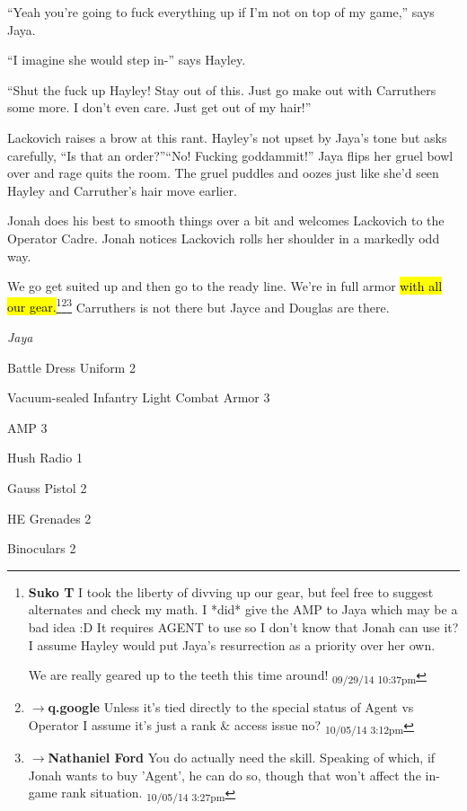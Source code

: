 ``Yeah you're going to fuck everything up if I'm not on top of my game,'' says Jaya.

``I imagine she would step in-'' says Hayley.

``Shut the fuck up Hayley!  Stay out of this.  Just go make out with Carruthers some more.  I don't even care.  Just get out of my hair!''

Lackovich raises a brow at this rant.  Hayley's not upset by Jaya's tone but asks carefully, ``Is that an order?''``No!  Fucking goddammit!''  Jaya flips her gruel bowl over and rage quits the room. The gruel puddles and oozes just like she'd seen Hayley and Carruther's hair move earlier.

Jonah does his best to smooth things over a bit and welcomes Lackovich to the Operator Cadre.  Jonah notices Lackovich rolls her shoulder in a markedly odd way.





We go get suited up and then go to the ready line.  We're in full armor \hl{with all our gear.}\footnote{\textbf{Suko T }I took the liberty of divving up our gear, but feel free to suggest alternates and check my math.  I *did* give the AMP to Jaya which may be a bad idea :D  It requires AGENT to use so I don't know that Jonah can use it?  I assume Hayley would put Jaya's resurrection as a priority over her own.

We are really geared up to the teeth this time around! \textsubscript{09/29/14 10:37pm}}\footnote{$\rightarrow$\textbf{q.google }Unless it's tied directly to the special status of Agent vs Operator I assume it's just a rank \& access issue no? \textsubscript{10/05/14 3:12pm}}\footnote{$\rightarrow$\textbf{Nathaniel Ford }You do actually need the skill. Speaking of which, if Jonah wants to buy 'Agent', he can do so, though that won't affect the in-game rank situation. \textsubscript{10/05/14 3:27pm}}  Carruthers is not there but Jayce and Douglas are there.



\textit{Jaya}

Battle Dress Uniform 2

Vacuum-sealed Infantry Light Combat Armor 3

AMP 3

Hush Radio 1

Gauss Pistol 2

HE Grenades 2

Binoculars 2

